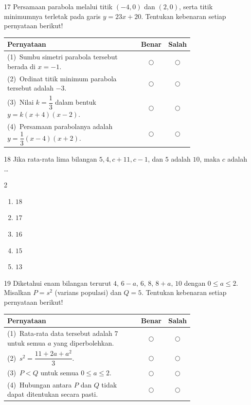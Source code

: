 \documentclass[11pt]{article}
\newenvironment{pilB}{%
  \par\smallskip\begin{multicols}{2}
  \begin{enumerate}[label=(\Alph*),leftmargin=*,itemsep=1pt,topsep=3pt]}%
  {\end{enumerate}\end{multicols}}
\begin{document}
\begin{soal}{17}
Persamaan parabola melalui titik $(-4,0)$ dan $(2,0)$, serta titik
minimumnya terletak pada garis $y=23x+20$.
Tentukan kebenaran setiap pernyataan berikut!

\par\smallskip
{\renewcommand{\arraystretch}{1.4}%
\begin{tabular}{@{}p{0.76\linewidth}cc@{}}
\hline
\textbf{Pernyataan} & \textbf{Benar} & \textbf{Salah}\\
\hline
(1)~Sumbu simetri parabola tersebut berada di $x=-1$.
  & $\bigcirc$ & $\bigcirc$\\
(2)~Ordinat titik minimum parabola tersebut adalah $-3$.
  & $\bigcirc$ & $\bigcirc$\\
(3)~Nilai $k=\dfrac{1}{3}$ dalam bentuk $y=k(x+4)(x-2)$.
  & $\bigcirc$ & $\bigcirc$\\
(4)~Persamaan parabolanya adalah $y=\dfrac{1}{3}(x-4)(x+2)$.
  & $\bigcirc$ & $\bigcirc$\\
\hline
\end{tabular}}
\end{soal}

\begin{soal}{18}
Jika rata-rata lima bilangan $5,4,c+11,c-1$, dan $5$ adalah $10$,
maka $c$ adalah \ldots
\begin{pilB}
  \item $18$ \item $17$ \item $16$ \item $15$ \item $13$
\end{pilB}
\end{soal}

\begin{soal}{19}
Diketahui enam bilangan terurut $4,\,6-a,\,6,\,8,\,8+a,\,10$ dengan
$0\leq a\leq2$. Misalkan $P=s^2$ (varians populasi) dan $Q=5$.
Tentukan kebenaran setiap pernyataan berikut!

\par\smallskip
{\renewcommand{\arraystretch}{1.4}%
\begin{tabular}{@{}p{0.76\linewidth}cc@{}}
\hline
\textbf{Pernyataan} & \textbf{Benar} & \textbf{Salah}\\
\hline
(1)~Rata-rata data tersebut adalah $7$ untuk semua $a$ yang
    diperbolehkan.
  & $\bigcirc$ & $\bigcirc$\\
(2)~$s^2 = \dfrac{11+2a+a^2}{3}$.
  & $\bigcirc$ & $\bigcirc$\\
(3)~$P < Q$ untuk semua $0\leq a\leq2$.
  & $\bigcirc$ & $\bigcirc$\\
(4)~Hubungan antara $P$ dan $Q$ tidak dapat ditentukan secara pasti.
  & $\bigcirc$ & $\bigcirc$\\
\hline
\end{tabular}}
\end{soal}
\end{document}
